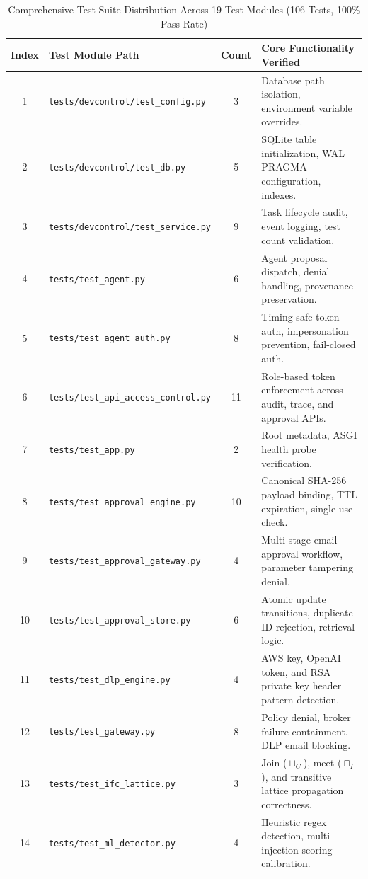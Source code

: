 \begin{table}[htbp]
\centering
\small
\caption{Comprehensive Test Suite Distribution Across 19 Test Modules (106 Tests, 100\% Pass Rate)}
\label{tab:test_suite}
\begin{tabularx}{\textwidth}{clcX}
\toprule
\textbf{Index} & \textbf{Test Module Path} & \textbf{Count} & \textbf{Core Functionality Verified} \\
\midrule
1 & \texttt{tests/devcontrol/test\_config.py} & 3 & Database path isolation, environment variable overrides. \\
2 & \texttt{tests/devcontrol/test\_db.py} & 5 & SQLite table initialization, WAL PRAGMA configuration, indexes. \\
3 & \texttt{tests/devcontrol/test\_service.py} & 9 & Task lifecycle audit, event logging, test count validation. \\
4 & \texttt{tests/test\_agent.py} & 6 & Agent proposal dispatch, denial handling, provenance preservation. \\
5 & \texttt{tests/test\_agent\_auth.py} & 8 & Timing-safe token auth, impersonation prevention, fail-closed auth. \\
6 & \texttt{tests/test\_api\_access\_control.py} & 11 & Role-based token enforcement across audit, trace, and approval APIs. \\
7 & \texttt{tests/test\_app.py} & 2 & Root metadata, ASGI health probe verification. \\
8 & \texttt{tests/test\_approval\_engine.py} & 10 & Canonical SHA-256 payload binding, TTL expiration, single-use check. \\
9 & \texttt{tests/test\_approval\_gateway.py} & 4 & Multi-stage email approval workflow, parameter tampering denial. \\
10 & \texttt{tests/test\_approval\_store.py} & 6 & Atomic update transitions, duplicate ID rejection, retrieval logic. \\
11 & \texttt{tests/test\_dlp\_engine.py} & 4 & AWS key, OpenAI token, and RSA private key header pattern detection. \\
12 & \texttt{tests/test\_gateway.py} & 8 & Policy denial, broker failure containment, DLP email blocking. \\
13 & \texttt{tests/test\_ifc\_lattice.py} & 3 & Join ($\sqcup_C$), meet ($\sqcap_I$), and transitive lattice propagation correctness. \\
14 & \texttt{tests/test\_ml\_detector.py} & 4 & Heuristic regex detection, multi-injection scoring calibration. \\

\end{tabularx}
\end{table}
